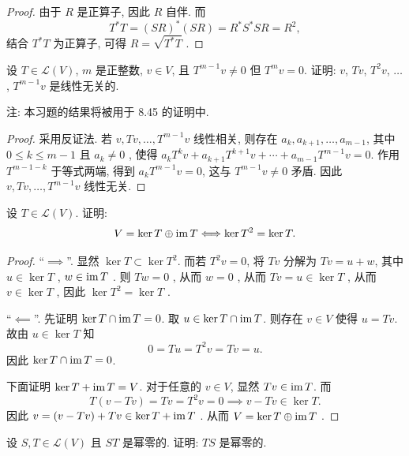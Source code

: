 \documentclass{article}
\begin{document}
\begin{proof}
  由于 \( R \) 是正算子, 因此 \( R \) 自伴. 而
  \[ T^*T=(SR)^*(SR)=R^*S^*SR=R^2, \]
  结合 \( T^*T \) 为正算子, 可得 \( R=\sqrt{T^*T} \) .
\end{proof}



\begin{problem}[8A-2]
设 $T \in \mathcal{L}(V)$, $m$ 是正整数, $v \in V$, 且 $T^{m-1} v \ne 0$ 但 $T^m v = 0$. 证明: $v$, $T v$, $T^2 v$, $\ldots$, $T^{m-1} v$ 是线性无关的.

注: 本习题的结果将被用于 8.45 的证明中.
\end{problem}

\begin{proof}
  采用反证法. 若 \( v,Tv,\dots,T^{m-1}v \) 线性相关, 则存在 \( a_k,a_{k+1},\dots,a_{m-1} \), 其中 \( 0\le k\le m-1 \) 且 \( a_k\neq 0 \) , 使得 \( a_k T^kv + a_{k+1} T^{k+1} v + \cdots + a_{m-1} T^{m-1} v = 0 \). 作用 \( T^{m-1-k} \) 于等式两端, 得到 \( a_k T^{m-1} v = 0 \), 这与 \( T^{m-1} v \ne 0 \) 矛盾. 因此 \( v,Tv,\dots,T^{m-1}v \) 线性无关.
\end{proof}



\begin{problem}[8A-3]
设 $T \in \mathcal{L}(V)$. 证明:
\[
V = \ker T \oplus \operatorname{im} T \Longleftrightarrow \ker T^2 = \ker T.
\]
\end{problem}

\begin{proof}
  ``\( \implies \)''. 显然 \( \ker T\subset \ker T^2 \). 而若 \( T^2v=0 \), 将 \( Tv \) 分解为 \( Tv=u+w \), 其中 \( u\in\ker T \) , \( w\in\operatorname{im} T \) . 则 \( Tw=0 \) , 从而 \( w=0 \) , 从而 \( Tv=u\in\ker T \) , 从而 \( v\in\ker T \) , 因此 \( \ker T^2=\ker T \) .

  ``\( \impliedby \)''. 先证明 \( \ker T\cap\operatorname{im} T=0 \). 取 \( u\in\ker T\cap\operatorname{im} T \). 则存在 \( v\in V \) 使得 \( u=Tv \). 故由 \( u\in\ker T \) 知
  \[ 0=Tu=T^2v=Tv=u. \]
  因此 \( \ker T\cap\operatorname{im} T=0 \). 

  下面证明 \( \ker T+\operatorname{im} T=V \). 对于任意的 \( v\in V \), 显然 \( Tv\in\operatorname{im} T \). 而
  \[ T(v-Tv)=Tv=T^2v=0\implies v-Tv\in\ker T. \]
  因此 \( v=(v-Tv)+Tv \in\ker T+\operatorname{im} T \) . 从而 \( V=\ker T\oplus\operatorname{im} T \) .
\end{proof}



\begin{problem}[8A-13]
设 $S, T \in \mathcal{L}(V)$ 且 $S T$ 是幂零的. 证明: $T S$ 是幂零的.
\end{problem}
\end{document}
